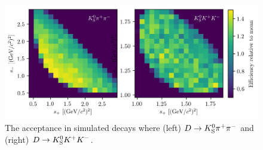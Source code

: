 \begin{figure}[tbp]
    \centering
    \includegraphics[width=\columnwidth]{figures/analysis/DP_thesis_profile_PiPi_and_KK_KK.png}
    \caption{The \lhcb acceptance in simulated \BtoDK decays where (left) ${\DtoKspipi}$ and (right) ${\DtoKsKK}$.}
    \label{fig:DP_profile}
\end{figure}

